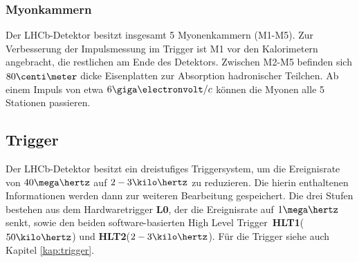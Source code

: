 \subsubsection{Myonkammern}
Der LHCb-Detektor besitzt insgesamt 5 Myonenkammern (M1-M5). Zur Verbesserung der Impulsmessung im Trigger ist M1 vor den Kalorimetern angebracht, die restlichen am Ende des Detektors. Zwischen M2-M5 befinden sich $80\centi\meter$ dicke Eisenplatten zur Absorption hadronischer Teilchen. Ab einem Impuls von etwa $6\giga\electronvolt/c$ können die Myonen alle 5 Stationen passieren. \cite{thesis_linn}

\subsection{Trigger}
Der LHCb-Detektor besitzt ein dreistufiges Triggersystem, um die Ereignisrate von $40\mega\hertz$ auf $2-3\kilo\hertz$ zu reduzieren. Die hierin enthaltenen Informationen werden dann zur weiteren Bearbeitung gespeichert. Die drei Stufen bestehen aus dem Hardwaretrigger \textbf{L0}, der die Ereignisrate auf $1\mega\hertz$ senkt, sowie den beiden software-basierten \glqq High Level Trigger\grqq\ \textbf{HLT1}($50\kilo\hertz$) und \textbf{HLT2}($2-3\kilo\hertz$). Für die Trigger siehe auch Kapitel \ref{kap:trigger}.